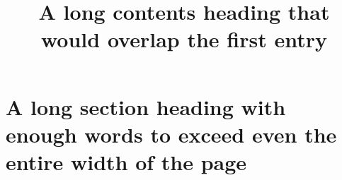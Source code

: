 \documentclass[fontset=fandol]{nbeamer}
\title{A long contents heading that would overlap the first entry}
\begin{document}
\begin{frame}\end{frame}
\section{A long section heading with enough words to exceed even the entire width of the page}
\begin{frame}\sectionpage\end{frame}
\end{document}
